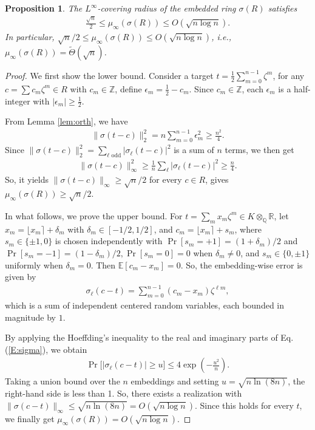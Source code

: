 \documentclass[11pt,a4paper]{article}
\theoremstyle{plain}
\newtheorem{proposition}[theorem]{Proposition}
\theoremstyle{definition}
\theoremstyle{remark}
\newcommand{\Z}{\mathbb{Z}}
\newcommand{\Q}{\mathbb{Q}}
\newcommand{\R}{\mathbb{R}}
\begin{document}
\begin{proposition}\label{prop:coverlower} 
The $L^\infty$-covering radius of the embedded ring $\sigma(R)$ satisfies
\begin{align}
  \frac{\sqrt{n}}{2} \le \mu_\infty(\sigma(R)) \le O(\sqrt{n\log n}).
  \label{E:coverbounds}
\end{align}
In particular, $\sqrt{n}/2\le\mu_\infty(\sigma(R))\le O(\sqrt{n\log n})$, i.e., $\mu_\infty(\sigma(R))=\tilde{\Theta}(\sqrt n)$.

\end{proposition}

\begin{proof}
We first show the lower bound. Consider a target $t=\frac{1}{2}\sum_{m=0}^{n-1}\zeta^m$, for any $c=\sum c_m\zeta^m \in R$ with $c_m\in\Z$, define $\epsilon_m=\frac{1}{2}-c_m$. Since $c_m\in\Z$, each $\epsilon_m$ is a half-integer with $|\epsilon_m|\ge\frac{1}{2}$.

From Lemma \ref{lem:orth}, we have
\begin{align}
  \|\sigma(t-c)\|_2^2=n\sum_{m=0}^{n-1}\epsilon_m^2 \ge \frac{n^2}{4}.
  \label{E:signnorm2}
\end{align}
Since $\|\sigma(t-c)\|_2^2=\sum_{\ell\text{ odd}}|\sigma_\ell(t-c)|^2$ is a sum of $n$ terms, we then get
\begin{align}
  \|\sigma(t-c)\|_\infty^2
  \ge \frac{1}{n}\sum_\ell|\sigma_\ell(t-c)|^2 \ge \frac{n}{4}.
  \label{E:signlow}
\end{align}
So, it yields $\|\sigma(t-c)\|_\infty \ge \sqrt{n}/2$ for every $c\in R$, gives $\mu_\infty(\sigma(R))\ge\sqrt{n}/2$.

In what follows, we prove the upper bound. For $t=\sum_m x_m\zeta^m\in K\otimes_\Q\R$, let $x_m=\lfloor x_m\rceil+\delta_m$ with $\delta_m\in[-1/2,1/2]$, and $c_m=\lfloor x_m\rceil+s_m$, where $s_m\in\{\pm 1, 0\}$ is chosen independently with $\Pr[s_m=+1]=(1+\delta_m)/2$ and $\Pr[s_m=-1]=(1-\delta_m)/2, \Pr[s_m=0]=0$ when $\delta_m\ne 0$, and $s_m\in\{0,\pm 1\}$ uniformly when $\delta_m=0$. Then $\mathbb{E}[c_m-x_m]=0$. So, the embedding-wise error is given by 
\begin{align}
  \sigma_\ell(c-t)=\sum_{m=0}^{n-1}(c_m-x_m)\zeta^{\ell m},
  \label{E:sigma}
\end{align}
which is a sum of independent centered random variables, each bounded in magnitude by $1$. 

By applying the Hoeffding's inequality to the real and imaginary parts of Eq.(\ref{E:sigma}), we obtain 
\begin{align}
  \Pr\bigl[|\sigma_\ell(c-t)|\ge u\bigr] \le 4\exp(-\frac{u^2}{n}).
  \label{E:probles}
\end{align}
Taking a union bound over the $n$ embeddings and setting
$u=\sqrt{n\ln(8n)}$, the right-hand side is less than 1. So, there exists a realization with $\|\sigma(c-t)\|_\infty\le\sqrt{n\ln(8n)}= O(\sqrt{n\log n})$. Since this holds for every $t$, we finally get $\mu_\infty(\sigma(R))=O(\sqrt{n\log n})$.
\end{proof}
\end{document}
